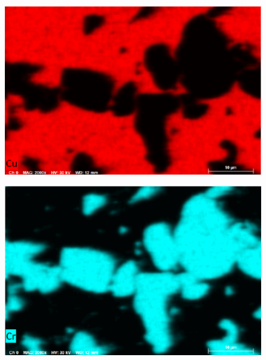 \documentclass[a4paper,12pt]{article}
\begin{document}
 \begin{figure}[h]
\centering
\begin{minipage}{.5\textwidth}
  \centering
  \includegraphics[width=1\linewidth]{Cu.png}
  \label{fig:Cu}
\end{minipage}%
\begin{minipage}{.5\textwidth}
  \centering
  \includegraphics[width=1\linewidth]{Cr.png}
  \label{fig:Cr}
\end{minipage}
\end{figure}
 
\end{document}
